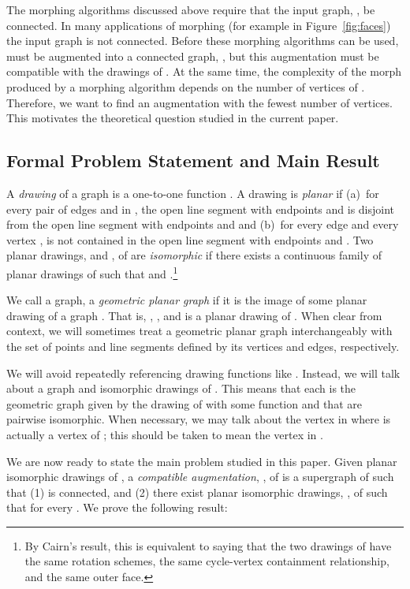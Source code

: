 \documentclass[11pt]{patmorin}
\begin{document}
The morphing algorithms discussed above require that the input graph,
, be connected. In many applications of morphing (for example
in Figure~\ref{fig:faces}) the input graph is not connected. Before these
morphing algorithms can be used,  must be augmented into a
connected graph, , but this augmentation must be compatible
with the drawings of .  At the same time, the complexity
of the morph produced by a morphing algorithm depends on the number of
vertices of .  Therefore, we want to find an augmentation
with the fewest number of vertices.  This motivates the theoretical
question studied in the current paper.





\subsection{Formal Problem Statement and Main Result}

A \emph{drawing} of a graph  is a one-to-one
function .  A drawing is \emph{planar} if (a)~for
every pair of edges  and  in , the open line segment with
endpoints  and  is disjoint from the open line
segment with endpoints  and  and (b)~for every edge
 and every vertex ,  is not contained in the open line
segment with endpoints  and .  Two planar drawings,
 and , of  are \emph{isomorphic} if
there exists a continuous family of planar drawings  of  such that 
and .\footnote{By Cairn's result, this is equivalent
to saying that the two drawings of  have the same rotation schemes,
the same cycle-vertex containment relationship, and the same outer face.}

We call a graph,  a \emph{geometric planar graph} if it is
the image of some planar drawing of a graph .  That is, ,
, and  is a planar
drawing of .  When clear from context, we will sometimes
treat a geometric planar graph interchangeably with the set of points
and line segments defined by its vertices and edges, respectively.

We will avoid repeatedly referencing drawing
functions like .  Instead, we will talk about a graph 
and  isomorphic drawings  of .  This
means that each  is the geometric graph given by the drawing of
 with some function  and that 
are pairwise isomorphic.  When necessary, we may talk about the vertex 
in  where  is actually a vertex of ; this should
be taken to mean the vertex  in .  

We are now ready to state the main problem studied in this paper.
Given  planar isomorphic drawings 
of , a \emph{compatible augmentation}, , of
 is a supergraph of  such that (1) 
is connected, and (2) there exist planar isomorphic drawings,
, of  such that  for every
.  We prove the following result:
\end{document}
